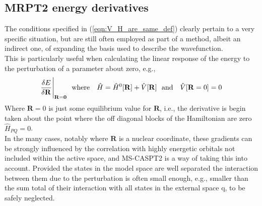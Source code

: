 \documentclass[12pt]{article}
\begin{document}
\subsection {MRPT2 energy derivatives}
\noindent The conditions specified in (\ref{eqn:V_H_are_same_def}) clearly pertain to 
a very specific situation, but are still often employed as part of a method, albeit an 
indirect one, of expanding the basis used to describe the wavefunction.\\

\noindent This is particularly useful when calculating the linear response of the energy to the
perturbation of a parameter about zero, e.g., 
\begin{equation}
\frac{ \delta E }{ \delta \mathbf{R} } \Bigg{|}_{\mathbf{\mathbf{R}=0}}
\text{\ \ where \ \ }
\hat{H} = \hat{H}^{0}[\mathbf{R}] + \hat{V}[\mathbf{R}] 
\text{\ \ and \ \ }
\hat{V}[\mathbf{R} = 0 ]  = 0 
\end{equation}
Where $\mathbf{R} = 0$ is just some equilibrium value for $\mathbf{R}$, i.e., the derivative is begin taken
about the point where the off diagonal blocks of the Hamiltonian are zero $\hat{H}_{PQ} = 0$. \\

\noindent  In the many cases, notably where $\mathbf{R}$ is a nuclear coordinate,
these gradients can be strongly influenced by the correlation with highly energetic orbitals not included
within the active space, and MS-CASPT2 is a way of taking this into account.
Provided the states in the model space are well separated the interaction between them due
to the perturbation is often small enough, e.g., smaller than the sum total of their 
interaction with all states in the external space $\mathrm{q}$, to be safely neglected.\\
\end{document}
